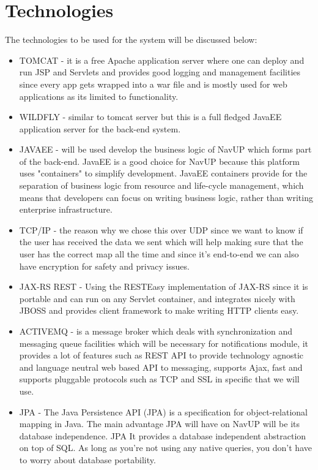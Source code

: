 
\section{Technologies}
The technologies to be used for the system will be discussed below:
\begin{itemize}
	\item TOMCAT - it is a free Apache application server where one can deploy and run JSP and Servlets and provides good logging and management facilities since every app gets wrapped into a war file and is mostly used for web applications as its limited to functionality.
	
	\item WILDFLY - similar to tomcat server but this is a full fledged JavaEE application server for the back-end system.
	
	\item JAVAEE - will be used develop the business logic of NavUP which forms part of the back-end. JavaEE is a good choice for NavUP because this platform uses "containers" to simplify development. JavaEE containers provide for the separation of business logic from resource and life-cycle management, which means that developers can focus on writing business logic, rather than writing enterprise infrastructure. 
	
	\item TCP/IP - the reason why we chose this over UDP since we want to know if the user has received the data we sent which will help making sure that the user has the correct map all the time and since it's end-to-end we can also have encryption for safety and privacy issues.
	
	\item JAX-RS REST - Using the RESTEasy implementation of JAX-RS since it is portable and can run on any Servlet container, and integrates nicely with JBOSS and provides client framework to make writing HTTP clients easy.
	
	\item ACTIVEMQ - is a message broker which deals with synchronization and messaging queue facilities which will be necessary for notifications module, it provides a lot of features such as REST API to provide  technology agnostic and language neutral web based API to messaging, supports Ajax, fast and supports pluggable protocols such as TCP and SSL in specific that we will use. 
	
	\item JPA - The Java Persistence API (JPA) is a specification for object-relational mapping in Java. The main advantage JPA will have on NavUP will be its database independence. JPA It provides a database independent abstraction on top of SQL. As long as you're not using any native queries, you don't have to worry about database portability. 
	

\end{itemize}
